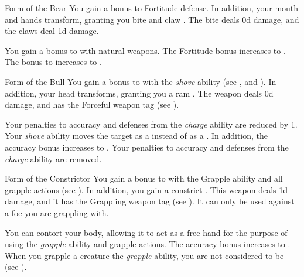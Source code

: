         {
            \begin{freeability}{Form of the Bear}
                You gain a  bonus to Fortitude defense.
                In addition, your mouth and hands transform, granting you bite and claw .
                The bite deals \plus0d damage, and the claws deal \minus1d damage.

                \rankline
                 You gain a  bonus to  with natural weapons.
                 The Fortitude bonus increases to .
                 The bonus to  increases to .
            \end{freeability}

            \begin{freeability}{Form of the Bull}
                You gain a  bonus to  with the \textit{shove} ability (see , and ).
                In addition, your head transforms, granting you a ram .
                The weapon deals \plus0d damage, and has the Forceful weapon tag (see ).

                \rankline
                 Your penalties to accuracy and defenses from the \textit{charge} ability are reduced by 1.
                 Your \textit{shove} ability moves the target as a  instead of as a .
                In addition, the accuracy bonus increases to .
                 Your penalties to accuracy and defenses from the \textit{charge} ability are removed.
            \end{freeability}

            \begin{freeability}{Form of the Constrictor}
                You gain a  bonus to  with the Grapple ability and all grapple actions (see ).
                In addition, you gain a constrict .
                This weapon deals \plus1d damage, and it has the Grappling weapon tag (see ).
                It can only be used against a foe you are grappling with.

                \rankline
                 You can contort your body, allowing it to act as a free hand for the purpose of using the \textit{grapple} ability and grapple actions.
                 The accuracy bonus increases to .
                 When you grapple a creature the \textit{grapple} ability, you are not considered to be  (see ).
            \end{freeability}

}
